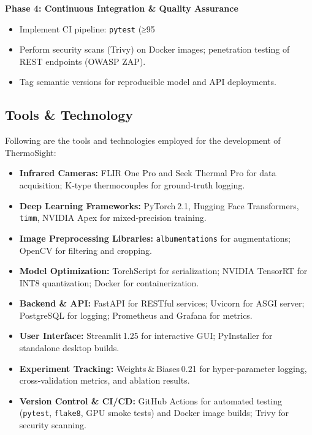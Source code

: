 \textbf{Phase 4: Continuous Integration \& Quality Assurance}
\begin{itemize}
    \item Implement CI pipeline: \texttt{pytest} (≥95 %
    \item Perform security scans (Trivy) on Docker images; penetration testing of REST endpoints (OWASP ZAP).
    \item Tag semantic versions for reproducible model and API deployments.
\end{itemize}

\subsection{Tools \& Technology}
Following are the tools and technologies employed for the development of ThermoSight:

\begin{itemize}
    \item \textbf{Infrared Cameras:} FLIR One Pro and Seek Thermal Pro for data acquisition; K‐type thermocouples for ground‐truth logging.
    \item \textbf{Deep Learning Frameworks:} PyTorch 2.1, Hugging Face Transformers, \texttt{timm}, NVIDIA Apex for mixed‐precision training.
    \item \textbf{Image Preprocessing Libraries:} \texttt{albumentations} for augmentations; OpenCV for filtering and cropping.
    \item \textbf{Model Optimization:} TorchScript for serialization; NVIDIA TensorRT for INT8 quantization; Docker for containerization.
    \item \textbf{Backend \& API:} FastAPI for RESTful services; Uvicorn for ASGI server; PostgreSQL for logging; Prometheus and Grafana for metrics.
    \item \textbf{User Interface:} Streamlit 1.25 for interactive GUI; PyInstaller for standalone desktop builds.
    \item \textbf{Experiment Tracking:} Weights & Biases 0.21 for hyper‐parameter logging, cross‐validation metrics, and ablation results.
    \item \textbf{Version Control \& CI/CD:} GitHub Actions for automated testing (\texttt{pytest}, \texttt{flake8}, GPU smoke tests) and Docker image builds; Trivy for security scanning.
\end{itemize}
